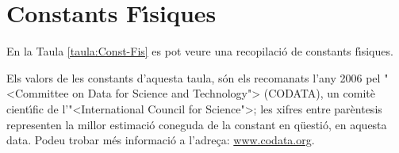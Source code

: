 \chapter{Constants F\'{\i}siques} 


En la Taula \vref{taula:Const-Fis} es pot veure una recopilaci\'{o} de
constants f\'{\i}siques.

Els valors de les constants d'aquesta taula, s\'{o}n els recomanats
l'any 2006 pel {"<}Committee on Data for Science and Technology{">}
(\textsf{CODATA}), un comit\`{e} cient\'{\i}fic de l'{"<}International Council
for Science{">}; les xifres entre par\`{e}ntesis representen la millor
estimaci\'{o} coneguda de la constant en q\"{u}esti\'{o}, en aquesta
data. Podeu trobar  m\'{e}s informaci\'{o} a
l'adre\c{c}a: \href{http://www.codata.org/}{www.codata.org}.

